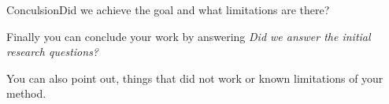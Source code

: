 \begin{frame}[t]{Conculsion}{Did we achieve the goal and what
  limitations are there?}

  Finally you can conclude your work by answering \textit{Did we
  answer the initial research questions?}

  You can also point out, things that did not work or known
  limitations of your method.

\end{frame}

